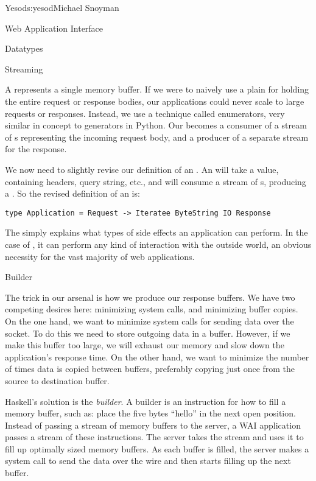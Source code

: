 \begin{aosachapter}{Yesod}{s:yesod}{Michael Snoyman}
\begin{aosasect1}{Web Application Interface}
\begin{aosasect2}{Datatypes}
\end{aosasect2}

\begin{aosasect2}{Streaming}

A  represents a single memory buffer. If we were to naively
use a plain  for holding the entire request or response
bodies, our applications could never scale to large requests or
responses. Instead, we use a technique called enumerators, very
similar in concept to generators in Python. Our  becomes a
consumer of a stream of s representing the incoming request
body, and a producer of a separate stream for the response.

We now need to slightly revise our definition of an . An
 will take a  value, containing headers, query
string, etc., and will consume a stream of s, producing a
. So the revised definition of an  is:

\begin{verbatim}
type Application = Request -> Iteratee ByteString IO Response
\end{verbatim}

\noindent The  simply explains what types of side effects an application can
perform. In the case of , it can perform any kind of interaction
with the outside world, an obvious necessity for the vast majority of
web applications.

\end{aosasect2}

\begin{aosasect2}{Builder}

The trick in our arsenal is how we produce our response buffers. We
have two competing desires here: minimizing system calls, and
minimizing buffer copies. On the one hand, we want to minimize system
calls for sending data over the socket. To do this we need to store
outgoing data in a buffer. However, if we make this buffer too large,
we will exhaust our memory and slow down the application's response
time. On the other hand, we want to minimize the number of times data
is copied between buffers, preferably copying just once from the
source to destination buffer.

Haskell's solution is the \emph{builder}. A builder is an instruction for how
to fill a memory buffer, such as: place the five bytes ``hello'' in the
next open position. Instead of passing a stream of memory buffers to
the server, a WAI application passes a stream of these
instructions. The server takes the stream and uses it to fill up
optimally sized memory buffers. As each buffer is filled, the server
makes a system call to send the data over the wire and then
starts filling up the next buffer.


\end{aosasect2}
\end{aosasect1}
\end{aosachapter}
